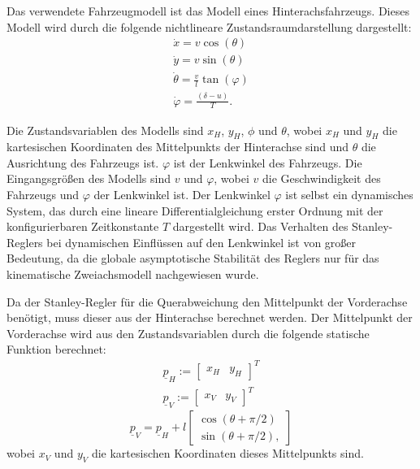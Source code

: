 \documentclass[arbeit=studie,oneside,BCOR=12mm]{ArbeitRST}
\begin{document}
Das verwendete Fahrzeugmodell ist das Modell eines Hinterachsfahrzeugs. Dieses
Modell wird durch die folgende nichtlineare Zustandsraumdarstellung
dargestellt: 
\begin{gather} 
  \dot{x} = v \cos(\theta) \\ 
  \dot{y} = v \sin(\theta) \\ 
  \dot{\theta} = \frac{v}{l}\tan(\varphi) \\
  \dot{\varphi} = \frac{\left(\delta-u\right)}{T}. 
\end{gather}

Die Zustandsvariablen des Modells sind $x_H$, $y_H$, $\phi$ und $\theta$, wobei
$x_H$ und $y_H$ die kartesischen Koordinaten des Mittelpunkts der Hinterachse
sind und $\theta$ die Ausrichtung des Fahrzeugs ist. $\varphi$ ist der
Lenkwinkel des Fahrzeugs. Die Eingangsgrößen des Modells sind $v$ und
$\varphi$, wobei $v$ die Geschwindigkeit des Fahrzeugs und $\varphi$ der
Lenkwinkel ist. Der Lenkwinkel $\varphi$ ist selbst ein dynamisches System, das
durch eine lineare Differentialgleichung erster Ordnung mit der
konfigurierbaren Zeitkonstante $T$ dargestellt wird. Das Verhalten des
Stanley-Reglers bei dynamischen Einflüssen auf den Lenkwinkel ist von großer
Bedeutung, da die globale asymptotische Stabilität des Reglers nur für das
kinematische Zweiachsmodell nachgewiesen wurde.

Da der Stanley-Regler für die Querabweichung den Mittelpunkt der Vorderachse
benötigt, muss dieser aus der Hinterachse berechnet werden. Der Mittelpunkt der
Vorderachse wird aus den Zustandsvariablen durch die folgende statische
Funktion berechnet: 
\begin{gather}
  \underline{p}_H := 
  \begin{bmatrix}
    x_H & y_H
  \end{bmatrix}^T \\
  \underline{p}_V := 
  \begin{bmatrix}
    x_V & y_V
  \end{bmatrix}^T
  \label{eq:Rear Axle and Front Axle}
\end{gather}
\begin{equation}
  \underline{p}_V = \underline{p}_H + l 
  \begin{bmatrix}
    \cos(\theta + \pi/2) \\ 
    \sin(\theta + \pi/2),
  \end{bmatrix}
  \label{eq:Transformation from Rear Axle to Front Axle}
\end{equation}
wobei $x_V$ und $y_V$ die kartesischen Koordinaten dieses Mittelpunkts sind. 
\end{document}

